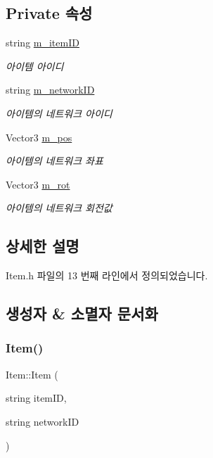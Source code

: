 \subsection*{Private 속성}
\begin{DoxyCompactItemize}
\item 
string \hyperlink{class_item_a8a89e78c25c95fe6f27d61d2416df1e5}{m\+\_\+item\+ID}
\begin{DoxyCompactList}\small\item\em 아이템 아이디 \end{DoxyCompactList}\item 
string \hyperlink{class_item_a3e5eae9a0cc3f98e421bc065c5b6f906}{m\+\_\+network\+ID}
\begin{DoxyCompactList}\small\item\em 아이템의 네트워크 아이디 \end{DoxyCompactList}\item 
Vector3 \hyperlink{class_item_a6b35031bbc368a4d04c2298f1b094973}{m\+\_\+pos}
\begin{DoxyCompactList}\small\item\em 아이템의 네트워크 좌표 \end{DoxyCompactList}\item 
Vector3 \hyperlink{class_item_a8442ba52568d84d584117ed8e4f11883}{m\+\_\+rot}
\begin{DoxyCompactList}\small\item\em 아이템의 네트워크 회전값 \end{DoxyCompactList}\end{DoxyCompactItemize}


\subsection{상세한 설명}


Item.\+h 파일의 13 번째 라인에서 정의되었습니다.



\subsection{생성자 \& 소멸자 문서화}
\mbox{\label{class_item_a08bbc0cfcebaee215cdcc6ea910850eb}} 
\subsubsection{\texorpdfstring{Item()}{Item()}}
{\footnotesize\ttfamily Item\+::\+Item (\begin{DoxyParamCaption}\item[{string}]{item\+ID,  }\item[{string}]{network\+ID }\end{DoxyParamCaption})}




